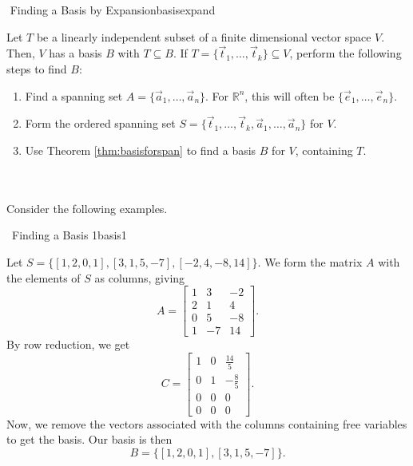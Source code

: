         \begin{theorem}{\Stop\,\,Finding a Basis by Expansion}{basisexpand}

            Let \(T\) be a linearly independent subset of a finite dimensional vector space \(V\). Then, \(V\) has a basis \(B\) with \(T\subseteq B\). If \(T=\{\vec{t}_1,\ldots,\vec{t}_k\}\subseteq V\), perform the following steps to find \(B\):
            \begin{enumerate}
                \item Find a spanning set \(A=\{\vec{a}_1,\ldots,\vec{a}_n\}\). For \(\mathbb{R}^n\), this will often be \(\{\vec{e}_1,\ldots,\vec{e}_n\}\).
                \item Form the ordered spanning set \(S=\{\vec{t}_1,\ldots,\vec{t}_k,\vec{a}_1,\ldots,\vec{a}_n\}\) for \(V\).
                \item Use Theorem \ref{thm:basisforspan} to find a basis \(B\) for \(V\), containing \(T\).
            \end{enumerate}

        \end{theorem}
        \pagebreak
        \vphantom
        \\
        \\
        Consider the following examples.
        \begin{example}{\Difficulty\,\Difficulty\,\,Finding a Basis 1}{basis1}

            Let \(S=\{[1,2,0,1],[3,1,5,-7],[-2,4,-8,14]\}\). We form the matrix \(A\) with the elements of \(S\) as columns, giving
            \begin{equation*}
                A=\begin{bmatrix}
                    1 & 3 & -2 \\ 
                    2 & 1 & 4 \\
                    0 & 5 & -8 \\
                    1 & -7 & 14
                \end{bmatrix}.
            \end{equation*}
            By row reduction, we get
            \begin{equation*}
                C=\begin{bmatrix}
                    1 & 0 & \frac{14}{5} \\
                    0 & 1 & -\frac{8}{5} \\
                    0 & 0 & 0 \\
                    0 & 0 & 0 
                \end{bmatrix}.
            \end{equation*} 
            Now, we remove the vectors associated with the columns containing free variables to get the basis. Our basis is then
            \begin{equation*}
                B=\{[1,2,0,1],[3,1,5,-7]\}.
            \end{equation*}
        \end{example}
